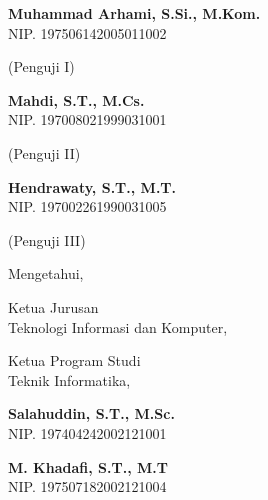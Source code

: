 \documentclass[12pt, a4paper, onecolumn, oneside]{report}
\begin{document}
\vspace{0.7cm}

\noindent
\begin{minipage}[t]{0.6\textwidth}
{\bfseries Muhammad Arhami, S.Si., M.Kom.}\\
NIP. 197506142005011002
\end{minipage}%
\begin{minipage}[t]{0.4\textwidth}
(Penguji I)
\end{minipage}

\vspace{0.7cm}

\noindent
\begin{minipage}[t]{0.6\textwidth}
{\bfseries Mahdi, S.T., M.Cs.}\\
NIP. 197008021999031001
\end{minipage}%
\begin{minipage}[t]{0.4\textwidth}
(Penguji II)
\end{minipage}

\vspace{0.7cm}

\noindent
\begin{minipage}[t]{0.6\textwidth}
{\bfseries Hendrawaty, S.T., M.T.}\\
NIP. 197002261990031005
\end{minipage}%
\begin{minipage}[t]{0.4\textwidth}
(Penguji III)
\end{minipage}

\vspace{1cm}

\begin{center}
Mengetahui,
\end{center}

\vspace{0.3cm}

\noindent
\begin{minipage}[t]{0.4\textwidth}
\parbox[t][1cm][t]{\linewidth}{Ketua Jurusan\\
Teknologi Informasi dan Komputer,}
\end{minipage}\hfill
\begin{minipage}[t]{0.4\textwidth}
\parbox[t][1cm][t]{\linewidth}{Ketua Program Studi\\
Teknik Informatika,}
\end{minipage}

\vspace{2cm}

\noindent
\begin{minipage}[t]{0.4\textwidth}
{\bfseries Salahuddin, S.T., M.Sc.}\\
NIP. 197404242002121001
\end{minipage}\hfill
\begin{minipage}[t]{0.4\textwidth}
{\bfseries M. Khadafi, S.T., M.T}\\
NIP. 197507182002121004
\end{minipage}
\end{document}
